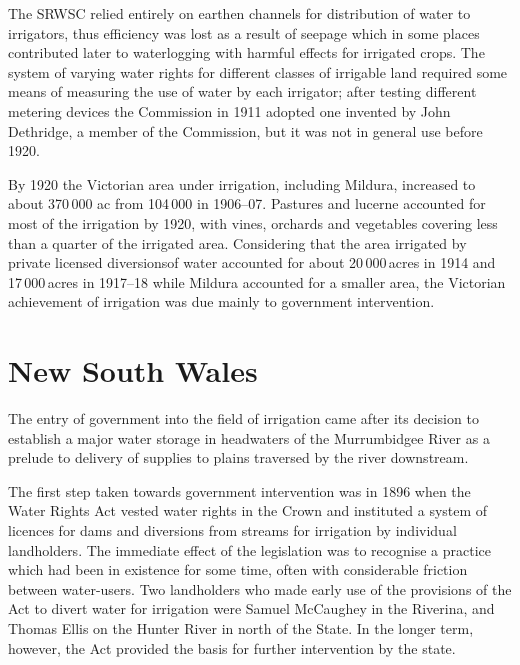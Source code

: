 The SRWSC relied entirely on earthen channels for distribution of
water to irrigators, thus efficiency was lost as a result of seepage
which in some places contributed later to waterlogging
 with harmful
effects for irrigated crops.  The system of varying water rights for
different classes of irrigable land required some means of measuring
the use of water by each irrigator; after testing different metering
devices the Commission in 1911 adopted one invented by John Dethridge,
a member of the Commission, but it was not in general use before
1920.

By 1920 the Victorian area under irrigation, including Mildura,
increased to about 370\,000 ac from 104\,000 in 1906--07.  Pastures
and luc\-er\-ne accounted for most of the irrigation by 1920, with
vines, orchards and vegetables covering less than a quarter of the
irrigated area. Considering that the area irrigated by private
licensed diversionsof water accounted for about 20\,000\,acres in 1914
and 17\,000\,acres in 1917--18 while Mildura accounted for a smaller
area, the Victorian achievement of irrigation was due mainly to
government intervention.

\section*{New South Wales}

The entry of government into the field of irrigation came after its
decision to establish a major water storage in headwaters of the
Murrumbidgee River  as a prelude to delivery
of supplies to plains traversed by the river downstream.

The first step taken towards government intervention was in 1896 when
the Water Rights Act 
vested water rights in the Crown and instituted a system of licences
for dams and diversions from streams for irrigation by individual
landholders.  The immediate effect of the legislation was to recognise
a practice which had been in existence for some time, often with
considerable friction between water-users.  Two landholders who made
early use of the provisions of the Act to divert water for irrigation
were Samuel McCaughey  in the Riverina, and
Thomas Ellis on the Hunter River  in north of the
State.  In the longer term, however, the Act provided the basis for
further intervention by the state.

